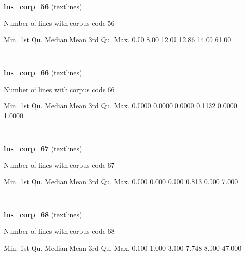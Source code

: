 \documentclass[]{article}
\newenvironment{Shaded}{\begin{snugshade}}{\end{snugshade}}
\newcommand{\FloatTok}[1]{\textcolor[rgb]{0.00,0.00,0.81}{{#1}}}
\newcommand{\NormalTok}[1]{{#1}}
\begin{document}
~

\vspace{1em}

\textbf{lns\_corp\_56} (textlines)

Number of lines with corpus code 56

\begin{Shaded}
\begin{Highlighting}[]
   \NormalTok{Min. 1st Qu.  Median    Mean 3rd Qu.    Max. }
   \FloatTok{0.00}    \FloatTok{8.00}   \FloatTok{12.00}   \FloatTok{12.86}   \FloatTok{14.00}   \FloatTok{61.00} 
\end{Highlighting}
\end{Shaded}

~

\vspace{1em}

\textbf{lns\_corp\_66} (textlines)

Number of lines with corpus code 66

\begin{Shaded}
\begin{Highlighting}[]
   \NormalTok{Min. 1st Qu.  Median    Mean 3rd Qu.    Max. }
 \FloatTok{0.0000}  \FloatTok{0.0000}  \FloatTok{0.0000}  \FloatTok{0.1132}  \FloatTok{0.0000}  \FloatTok{1.0000} 
\end{Highlighting}
\end{Shaded}

~

\vspace{1em}

\textbf{lns\_corp\_67} (textlines)

Number of lines with corpus code 67

\begin{Shaded}
\begin{Highlighting}[]
   \NormalTok{Min. 1st Qu.  Median    Mean 3rd Qu.    Max. }
  \FloatTok{0.000}   \FloatTok{0.000}   \FloatTok{0.000}   \FloatTok{0.813}   \FloatTok{0.000}   \FloatTok{7.000} 
\end{Highlighting}
\end{Shaded}

~

\vspace{1em}

\textbf{lns\_corp\_68} (textlines)

Number of lines with corpus code 68

\begin{Shaded}
\begin{Highlighting}[]
   \NormalTok{Min. 1st Qu.  Median    Mean 3rd Qu.    Max. }
  \FloatTok{0.000}   \FloatTok{1.000}   \FloatTok{3.000}   \FloatTok{7.748}   \FloatTok{8.000}  \FloatTok{47.000} 
\end{Highlighting}
\end{Shaded}
\end{document}
